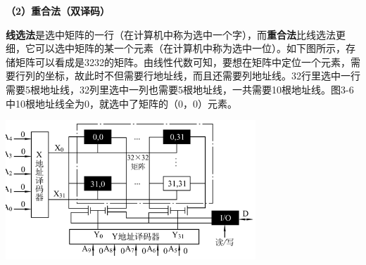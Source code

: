 \textbf{（2）重合法（双译码）}

\textbf{线选法}是选中矩阵的一行（在计算机中称为选中一个字），而\textbf{重合法}比线选法更细，它可以选中矩阵的某一个元素（在计算机中称为选中一位）。如下图所示，存储矩阵可以看成是3232的矩阵。由线性代数可知，要想在矩阵中定位一个元素，需要行列的坐标，故此时不但需要行地址线，而且还需要列地址线。32行里选中一行需要5根地址线，32列里选中一列也需要5根地址线，一共需要10根地址线。图3-6中10根地址线全为0，就选中了矩阵的（0，0）元素。

\includegraphics[width=3.69792in,height=2.06250in]{png-jpeg-pics/447C0262C0FFF357F20348C35B08E9FB.png}
